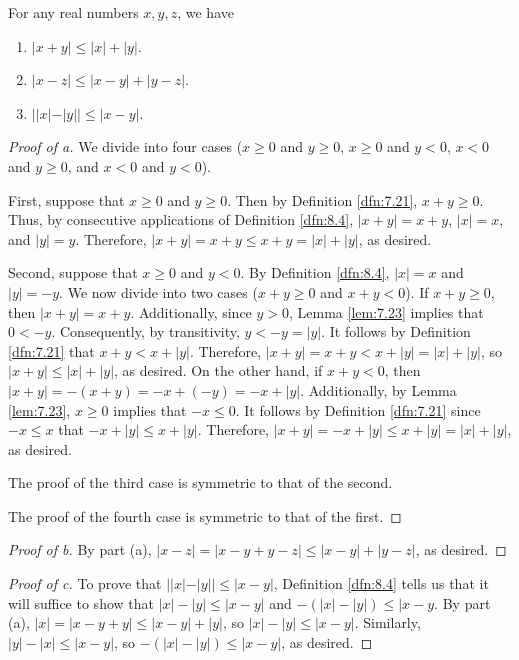 \documentclass[../main.tex]{subfiles}
\begin{document}
\begin{lemma}\label{lem:8.8}
    For any real numbers $x,y,z$, we have
    \begin{enumerate}[label={\textup{(}\alph*\textup{)}}]
        \item $|x+y|\leq|x|+|y|$.
        \item $|x-z|\leq|x-y|+|y-z|$.
        \item $||x|-|y||\leq|x-y|$.
    \end{enumerate}
    \begin{proof}[Proof of a]
        We divide into four cases ($x\geq 0$ and $y\geq 0$, $x\geq 0$ and $y<0$, $x<0$ and $y\geq 0$, and $x<0$ and $y<0$).\par
        First, suppose that $x\geq 0$ and $y\geq 0$. Then by Definition \ref{dfn:7.21}, $x+y\geq 0$. Thus, by consecutive applications of Definition \ref{dfn:8.4}, $|x+y|=x+y$, $|x|=x$, and $|y|=y$. Therefore, $|x+y|=x+y\leq x+y=|x|+|y|$, as desired.\par
        Second, suppose that $x\geq 0$ and $y<0$. By Definition \ref{dfn:8.4}, $|x|=x$ and $|y|=-y$. We now divide into two cases ($x+y\geq 0$ and $x+y<0$). If $x+y\geq 0$, then $|x+y|=x+y$. Additionally, since $y>0$, Lemma \ref{lem:7.23} implies that $0<-y$. Consequently, by transitivity, $y<-y=|y|$. It follows by Definition \ref{dfn:7.21} that $x+y<x+|y|$. Therefore, $|x+y|=x+y<x+|y|=|x|+|y|$, so $|x+y|\leq|x|+|y|$, as desired. On the other hand, if $x+y<0$, then $|x+y|=-(x+y)=-x+(-y)=-x+|y|$. Additionally, by Lemma \ref{lem:7.23}, $x\geq 0$ implies that $-x\leq 0$. It follows by Definition \ref{dfn:7.21} since $-x\leq x$ that $-x+|y|\leq x+|y|$. Therefore, $|x+y|=-x+|y|\leq x+|y|=|x|+|y|$, as desired.\par
        The proof of the third case is symmetric to that of the second.\par
        The proof of the fourth case is symmetric to that of the first.
    \end{proof}
    \begin{proof}[Proof of b]
        By part (a), $|x-z|=|x-y+y-z|\leq |x-y|+|y-z|$, as desired.
    \end{proof}
    \begin{proof}[Proof of c]
        To prove that $||x|-|y||\leq|x-y|$, Definition \ref{dfn:8.4} tells us that it will suffice to show that $|x|-|y|\leq|x-y|$ and $-(|x|-|y|)\leq|x-y$. By part (a), $|x|=|x-y+y|\leq|x-y|+|y|$, so $|x|-|y|\leq|x-y|$. Similarly, $|y|-|x|\leq|x-y|$, so $-(|x|-|y|)\leq|x-y|$, as desired.
    \end{proof}
\end{lemma}
\end{document}
